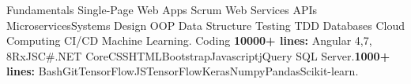 \vspace{-3mm}
\begin{cvskills}
\vspace{1.5mm}\cvskill
    {Fundamentals}
    {Single-Page Web Apps \skilltypestyle{\textbf{|}} Scrum \skilltypestyle{\textbf{ |}} Web Services APIs \skilltypestyle{\textbf{ |}} Microservices\skilltypestyle{\textbf{ | }}Systems Design\skilltypestyle{\textbf{ |}} OOP \skilltypestyle{\textbf{|}} Data Structure \skilltypestyle{\textbf{ |}}\newline Testing\skilltypestyle{\textbf{ |}} TDD \skilltypestyle{\textbf{ |}} Databases\skilltypestyle{\textbf{ |}} Cloud Computing\skilltypestyle{\textbf{ |}} CI/CD\skilltypestyle{\textbf{ |}} Machine Learning.}
\vspace{1.5mm}\cvskill
     {Coding}
    {\textbf{10000+ lines:} Angular 4,7, 8\skilltypestyle{\textbf{ | }}RxJS\skilltypestyle{\textbf{ | }}C\#\skilltypestyle{\textbf{ | }}.NET Core\skilltypestyle{\textbf{ | }}CSS\skilltypestyle{\textbf{ | }}HTML\skilltypestyle{\textbf{ | }}Bootstrap\skilltypestyle{\textbf{ | }}Javascript\skilltypestyle{\textbf{ | }}jQuery \skilltypestyle{\textbf{ | }}SQL Server.\newline \textbf{1000+ lines:} Bash\skilltypestyle{\textbf{ | }}Git\skilltypestyle{\textbf{ | }}TensorFlowJS\skilltypestyle{\textbf{ | }}TensorFlow\skilltypestyle{\textbf{ | }}Keras\skilltypestyle{\textbf{ | }}Numpy\skilltypestyle{\textbf{ | }}Pandas\skilltypestyle{\textbf{ | }}Scikit-learn.  }          
\end{cvskills}
